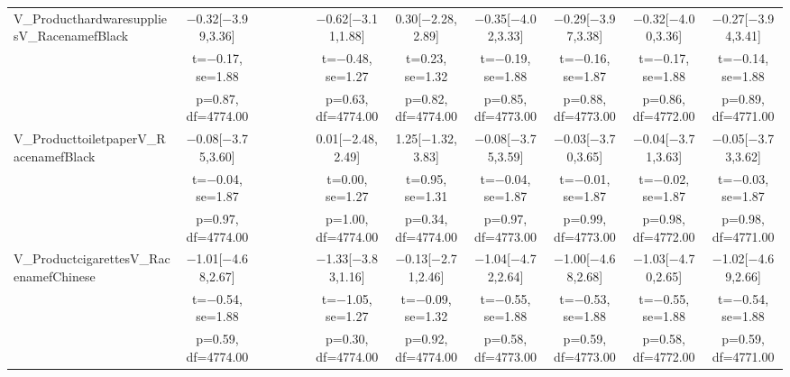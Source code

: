 \documentclass[]{report}
\begin{document}
\begin{table}
{\begin{tabular}[t]{lccccccccccc}
		V\_ProducthardwaresuppliesV\_RacenamefBlack & \num{-0.32}[\num{-3.99},\num{3.36}] &  &  &  &  & \num{-0.62}[\num{-3.11},\num{1.88}] & \num{0.30}[\num{-2.28},\num{2.89}] & \num{-0.35}[\num{-4.02},\num{3.33}] & \num{-0.29}[\num{-3.97},\num{3.38}] & \num{-0.32}[\num{-4.00},\num{3.36}] & \num{-0.27}[\num{-3.94},\num{3.41}]\\
		& t=\num{-0.17}, se=\num{1.88} &  &  &  &  & t=\num{-0.48}, se=\num{1.27} & t=\num{0.23}, se=\num{1.32} & t=\num{-0.19}, se=\num{1.88} & t=\num{-0.16}, se=\num{1.87} & t=\num{-0.17}, se=\num{1.88} & t=\num{-0.14}, se=\num{1.88}\\
		& p=\num{0.87}, df=\num{4774.00} &  &  &  &  & p=\num{0.63}, df=\num{4774.00} & p=\num{0.82}, df=\num{4774.00} & p=\num{0.85}, df=\num{4773.00} & p=\num{0.88}, df=\num{4773.00} & p=\num{0.86}, df=\num{4772.00} & p=\num{0.89}, df=\num{4771.00}\\
		V\_ProducttoiletpaperV\_RacenamefBlack & \num{-0.08}[\num{-3.75},\num{3.60}] &  &  &  &  & \num{0.01}[\num{-2.48},\num{2.49}] & \num{1.25}[\num{-1.32},\num{3.83}] & \num{-0.08}[\num{-3.75},\num{3.59}] & \num{-0.03}[\num{-3.70},\num{3.65}] & \num{-0.04}[\num{-3.71},\num{3.63}] & \num{-0.05}[\num{-3.73},\num{3.62}]\\
		& t=\num{-0.04}, se=\num{1.87} &  &  &  &  & t=\num{0.00}, se=\num{1.27} & t=\num{0.95}, se=\num{1.31} & t=\num{-0.04}, se=\num{1.87} & t=\num{-0.01}, se=\num{1.87} & t=\num{-0.02}, se=\num{1.87} & t=\num{-0.03}, se=\num{1.87}\\
		& p=\num{0.97}, df=\num{4774.00} &  &  &  &  & p=\num{1.00}, df=\num{4774.00} & p=\num{0.34}, df=\num{4774.00} & p=\num{0.97}, df=\num{4773.00} & p=\num{0.99}, df=\num{4773.00} & p=\num{0.98}, df=\num{4772.00} & p=\num{0.98}, df=\num{4771.00}\\
		V\_ProductcigarettesV\_RacenamefChinese & \num{-1.01}[\num{-4.68},\num{2.67}] &  &  &  &  & \num{-1.33}[\num{-3.83},\num{1.16}] & \num{-0.13}[\num{-2.71},\num{2.46}] & \num{-1.04}[\num{-4.72},\num{2.64}] & \num{-1.00}[\num{-4.68},\num{2.68}] & \num{-1.03}[\num{-4.70},\num{2.65}] & \num{-1.02}[\num{-4.69},\num{2.66}]\\
		& t=\num{-0.54}, se=\num{1.88} &  &  &  &  & t=\num{-1.05}, se=\num{1.27} & t=\num{-0.09}, se=\num{1.32} & t=\num{-0.55}, se=\num{1.88} & t=\num{-0.53}, se=\num{1.88} & t=\num{-0.55}, se=\num{1.88} & t=\num{-0.54}, se=\num{1.88}\\
		& p=\num{0.59}, df=\num{4774.00} &  &  &  &  & p=\num{0.30}, df=\num{4774.00} & p=\num{0.92}, df=\num{4774.00} & p=\num{0.58}, df=\num{4773.00} & p=\num{0.59}, df=\num{4773.00} & p=\num{0.58}, df=\num{4772.00} & p=\num{0.59}, df=\num{4771.00}\\

\end{tabular}}
\end{table}
\end{document}
